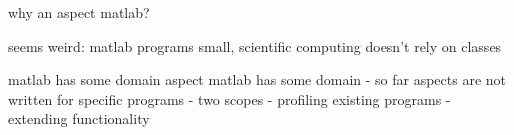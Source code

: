 why an aspect matlab?

seems weird:
matlab programs small, scientific computing doesn't rely on
classes






matlab has some domain
aspect matlab has some domain
- so far aspects are not written for specific programs
- two scopes
- profiling existing programs
- extending functionality








